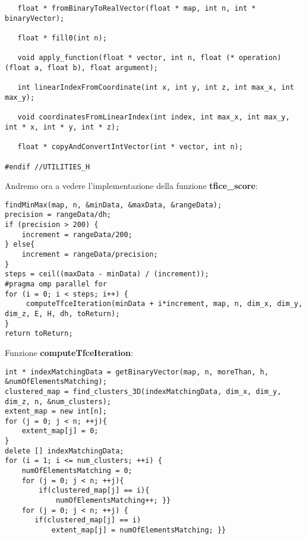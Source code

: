 \documentclass{beamer}
\begin{document}
\begin{frame}[fragile]
\begin{center}
\begin{lstlisting}
   float * fromBinaryToRealVector(float * map, int n, int * binaryVector);

   float * fill0(int n);

   void apply_function(float * vector, int n, float (* operation) (float a, float b), float argument);

   int linearIndexFromCoordinate(int x, int y, int z, int max_x, int max_y);

   void coordinatesFromLinearIndex(int index, int max_x, int max_y, int * x, int * y, int * z);

   float * copyAndConvertIntVector(int * vector, int n);
   
#endif //UTILITIES_H
\end{lstlisting}
\end{center}
\end{frame}

\begin{frame}[fragile]
Andremo ora a vedere l'implementazione della funzione \textbf{tfice\_score}:
\begin{center}
\begin{lstlisting}
findMinMax(map, n, &minData, &maxData, &rangeData);
precision = rangeData/dh;
if (precision > 200) {
    increment = rangeData/200;
} else{
    increment = rangeData/precision;	
}
steps = ceil((maxData - minData) / (increment));
#pragma omp parallel for
for (i = 0; i < steps; i++) {
     computeTfceIteration(minData + i*increment, map, n, dim_x, dim_y, dim_z, E, H, dh, toReturn);
}	
return toReturn;
\end{lstlisting}
\end{center}
\end{frame}

\begin{frame}[fragile]
Funzione \textbf{computeTfceIteration}:
\begin{center}
\begin{lstlisting}
int * indexMatchingData = getBinaryVector(map, n, moreThan, h, &numOfElementsMatching);
clustered_map = find_clusters_3D(indexMatchingData, dim_x, dim_y, dim_z, n, &num_clusters);
extent_map = new int[n];
for (j = 0; j < n; ++j){
    extent_map[j] = 0;
}
delete [] indexMatchingData;
for (i = 1; i <= num_clusters; ++i) {
    numOfElementsMatching = 0;	
    for (j = 0; j < n; ++j){
        if(clustered_map[j] == i){
            numOfElementsMatching++; }}
    for (j = 0; j < n; ++j) {
       if(clustered_map[j] == i)
           extent_map[j] = numOfElementsMatching; }}
\end{lstlisting}
\end{center}
\end{frame}
\end{document}
